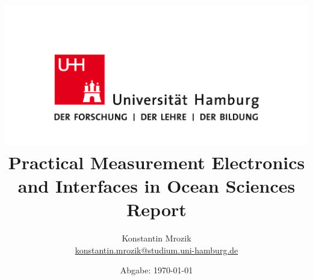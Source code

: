 

\title{\includegraphics[scale=0.05]{bilder/uhh-logo.jpg}\\[2\baselineskip]Practical Measurement Electronics and Interfaces in Ocean Sciences\\
\small{Report}}
\author{%
  Konstantin Mrozik\\
  \href{mailto:konstantin.mrozik@studium.uni-hamburg.de}{konstantin.mrozik@studium.uni-hamburg.de}%
}
\date{
  Abgabe: \today
}
\publishers{IfM Uni Hamburg}
\makeatletter


\def\@maketitle{
\raggedright
\begin{center}
{\Huge \bfseries \sffamily \@title }\\[4ex] 
{\Large  \@author}\\[4ex] 
\@date\\[8ex]
\publishers\\
\end{center}}
\makeatother





\maketitle
\thispagestyle{empty}
\tableofcontents
\newpage




\newpage
\nocite{*}
\printbibliography


